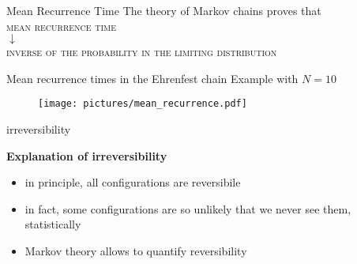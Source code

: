  \begin{frame}{Mean Recurrence Time}
    \centering
    The theory of Markov chains proves that \\
    \vspace{20pt}
    \Large
    \alert{\textsc{mean recurrence time}} \\
    \vspace{5pt}
    \alert{$\downarrow$} \\
    \vspace{10pt}
    \large
    \alert{\textsc{inverse of the probability in the limiting distribution}}
  \end{frame}

  \begin{frame}{Mean recurrence times in the Ehrenfest chain}
    \vspace{30pt}
    Example with $N = 10$
    \begin{figure}
      \texttt{[image: pictures/mean\_recurrence.pdf]}
    \end{figure}
  \end{frame}




  \begin{frame}{irreversibility}
    \begin{center}
      \Large \textbf{Explanation of irreversibility}
    \end{center}
    \begin{itemize}
      \item \alert{in principle}, all configurations are reversibile
      \item \alert{in fact}, some configurations are so unlikely that we never see them, statistically
      \item Markov theory allows to quantify reversibility
    \end{itemize}
  \end{frame}
